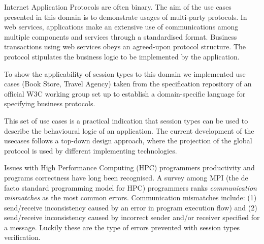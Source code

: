 
 
Internet Application Protocols are often binary. The aim of the use cases presented in this domain is to demonstrate usages of multi-party protocols. In web services, applications make an extensive use of communications among multiple components and services through a standardised format. Business transactions using web services
obeys an agreed-upon protocol structure. The protocol stipulates the business logic to be implemented by the application. 

To show the applicability of session types to this domain we implemented use cases (Book Store, Travel Agency) taken from the specification repository of an official W3C working group set up to establish a domain-specific language for specifying business protocols. 
 
This set of use cases is a practical indication that session types can be used to describe the behavioural logic of an application. The current development of the usecases follows a top-down design approach, where the projection of the global protocol is used by different
implementing technologies.


Issues with High Performance Computing (HPC) programmers productivity and programs correctness have long been recognised. A survey among MPI (the de facto standard programming model for HPC) programmers \cite{MPIErrors} ranks \textit{communication mismatches} as the most common errors. Communication mismatches include: (1) send/receive inconsistency caused by an error in program execution flow) and (2) send/receive inconsistency caused by incorrect sender and/or receiver specified for a message. Luckily these are the type of errors prevented with session types verification. 

